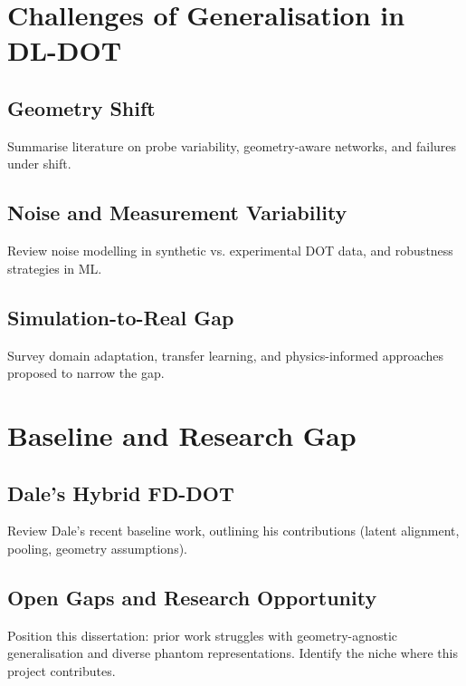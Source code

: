 \section{Challenges of Generalisation in DL-DOT}
\subsection{Geometry Shift}
Summarise literature on probe variability, geometry-aware networks, and failures under shift.
\subsection{Noise and Measurement Variability}
Review noise modelling in synthetic vs. experimental DOT data, and robustness strategies in ML.
\subsection{Simulation-to-Real Gap}
Survey domain adaptation, transfer learning, and physics-informed approaches proposed to narrow the gap.

\section{Baseline and Research Gap}
\subsection{Dale’s Hybrid FD-DOT}
Review Dale’s recent baseline work, outlining his contributions (latent alignment, pooling, geometry assumptions).
\subsection{Open Gaps and Research Opportunity}
Position this dissertation: prior work struggles with geometry-agnostic generalisation and diverse phantom representations. Identify the niche where this project contributes.
